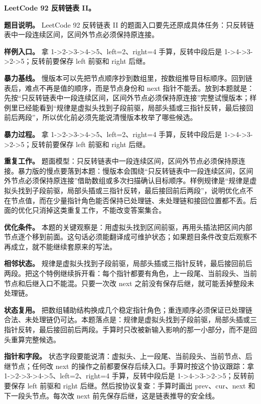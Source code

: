 \noindent\textbf{LeetCode 92 反转链表 II。}

\textbf{题目说明。} LeetCode 92 反转链表 II 的题面入口要先还原成具体任务：只反转链表中一段连续区间，区间外节点必须保持原连接。

\textbf{样例入口。} 拿 1->2->3->4->5、left=2、right=4 手算，反转中段后是 1->4->3->2->5；反转前要保存 left 前驱和 right 后继。

\textbf{暴力基线。} 慢版本可以先把节点顺序抄到数组里，按数组推导目标顺序。回到链表后，难点不再是值的顺序，而是节点身份和 next 指针不能丢。放到本题就是：先按“只反转链表中一段连续区间，区间外节点必须保持原连接”完整试慢版本；样例里已经能看到“规律是虚拟头找到子段前驱，局部头插或三指针反转，最后接回前后两段”，所以优化前必须先能说清慢版本枚举了哪些候选。

\textbf{暴力过程。} 拿 1->2->3->4->5、left=2、right=4 手算，反转中段后是 1->4->3->2->5；反转前要保存 left 前驱和 right 后继。

\textbf{重复工作。} 题面模型：只反转链表中一段连续区间，区间外节点必须保持原连接。暴力版的慢点要落到本题：慢版本会围绕“只反转链表中一段连续区间，区间外节点必须保持原连接”借助数组或多次扫描确认目标顺序。样例规律是“规律是虚拟头找到子段前驱，局部头插或三指针反转，最后接回前后两段”，说明优化点不在节点值，而在少量指针角色能否保持已处理链、未处理链和接回位置都不丢。后面的优化只消掉这类重复工作，不能改变答案集合。

\textbf{优化条件。} 本题的关键观察是：用虚拟头找到区间前驱，再用头插法把区间内部节点逐个移到前面。这句话必须能翻译成可维护状态；如果题目条件改变后观察不再成立，就不能继续套原来的写法。

\textbf{相邻状态。} 规律是虚拟头找到子段前驱，局部头插或三指针反转，最后接回前后两段。把这个特例继续拆开看：每个指针都要有角色，上一段尾、当前段头、当前节点和后继入口不能混。只要一次改 next 之前没有保存后继，就可能丢掉整段未处理链。

\textbf{状态复用。} 把数组辅助结构换成几个稳定指针角色；重连顺序必须保证已处理链合法、未处理链仍可达。本题落点是：规律是虚拟头找到子段前驱，局部头插或三指针反转，最后接回前后两段。手算时只改被新输入影响的那一小部分，而不是回头重算完整候选。

\textbf{指针和字段。} 状态字段要能说清：虚拟头、上一段尾、当前段头、当前节点、后继节点；任何改 next 的操作之前都要保存后续入口。手算时按这个协议跟踪：拿 1->2->3->4->5、left=2、right=4 手算，反转中段后是 1->4->3->2->5；反转前要保存 left 前驱和 right 后继。然后按协议复查：手算时画出 prev、cur、next 和下一段头节点。每次改 next 前先保存后继，这是链表推导的安全线。

